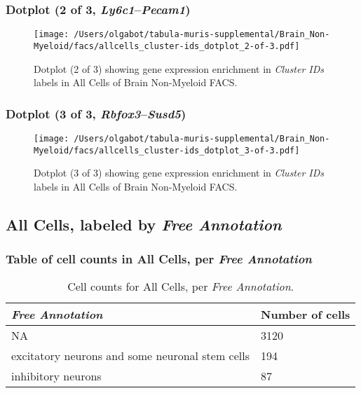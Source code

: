 \clearpage

\subsubsection{Dotplot (2 of 3, \emph{Ly6c1}--\emph{Pecam1})}
\begin{figure}[h]
\centering
\texttt{[image: /Users/olgabot/tabula-muris-supplemental/Brain\_Non-Myeloid/facs/allcells\_cluster-ids\_dotplot\_2-of-3.pdf]}

\caption{ Dotplot (2 of 3)  showing gene expression enrichment in \emph{Cluster IDs} labels in All Cells of Brain Non-Myeloid FACS. }
\end{figure}


\clearpage

\subsubsection{Dotplot (3 of 3, \emph{Rbfox3}--\emph{Susd5})}
\begin{figure}[h]
\centering
\texttt{[image: /Users/olgabot/tabula-muris-supplemental/Brain\_Non-Myeloid/facs/allcells\_cluster-ids\_dotplot\_3-of-3.pdf]}

\caption{ Dotplot (3 of 3)  showing gene expression enrichment in \emph{Cluster IDs} labels in All Cells of Brain Non-Myeloid FACS. }
\end{figure}


\clearpage

\subsection{All Cells, labeled by \emph{Free Annotation}}
\subsubsection{Table of cell counts in All Cells, per \emph{Free Annotation}}\begin{table}[h]
\centering
\label{my-label}
\begin{tabular}{@{}ll@{}}
\toprule

\emph{Free Annotation}& Number of cells \\ \midrule
NA & 3120 \\

excitatory neurons and some neuronal stem cells & 194 \\

inhibitory neurons & 87 \\
\bottomrule
\end{tabular}
\caption{Cell counts for All Cells, per \emph{Free Annotation}.}
\end{table}

